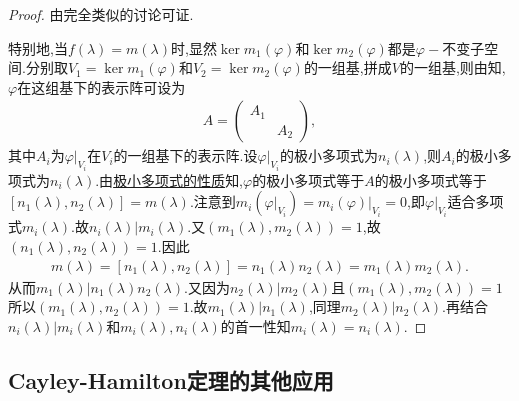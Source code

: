 \documentclass[../../main.tex]{subfiles}%
\begin{document}
\begin{proof}
由完全类似的讨论可证.

特别地,当$f(\lambda)=m(\lambda)$时,显然$\ker m_1\left( \varphi \right)$和$\ker m_2\left( \varphi \right)$都是$\varphi-$不变子空间.分别取$V_1=\ker m_1\left( \varphi \right)$和$V_2=\ker m_2\left( \varphi \right)$的一组基,拼成$V$的一组基,则由知,$\varphi$在这组基下的表示阵可设为
\begin{align*}
A=\begin{pmatrix}
A_1&		\\
&		A_2
\end{pmatrix},
\end{align*}
其中$A_i$为$\varphi |_{V_i}$在$V_i$的一组基下的表示阵.设$\varphi |_{V_i}$的极小多项式为$n_i\left( \lambda \right)$,则$A_i$的极小多项式为$n_i\left( \lambda \right)$.由\hyperref[proposition:极小多项式的性质]{极小多项式的性质}知,$\varphi$的极小多项式等于$A$的极小多项式等于$\left[ n_1\left( \lambda \right) ,n_2\left( \lambda \right) \right] =m\left( \lambda \right)$.注意到$m_i\left( \varphi |_{V_i} \right) =m_i\left( \varphi \right) |_{V_i}=0$,即$\varphi |_{V_i}$适合多项式$m_i\left( \lambda \right)$.故$n_i\left( \lambda \right) |m_i\left( \lambda \right)$.又$\left( m_1\left( \lambda \right) ,m_2\left( \lambda \right) \right) =1$,故$\left( n_1\left( \lambda \right) ,n_2\left( \lambda \right) \right) =1$.因此
\begin{align*}
m\left( \lambda \right) =\left[ n_1\left( \lambda \right) ,n_2\left( \lambda \right) \right] =n_1\left( \lambda \right) n_2\left( \lambda \right) =m_1\left( \lambda \right) m_2\left( \lambda \right).
\end{align*}
从而$m_1\left( \lambda \right) |n_1\left( \lambda \right) n_2\left( \lambda \right)$.又因为$n_2\left( \lambda \right) |m_2\left( \lambda \right)$且$\left( m_1\left( \lambda \right) ,m_2\left( \lambda \right) \right) =1$所以$\left( m_1\left( \lambda \right) ,n_2\left( \lambda \right) \right) =1$.故$m_1\left( \lambda \right) |n_1\left( \lambda \right)$,同理$m_2\left( \lambda \right) |n_2\left( \lambda \right)$.再结合$n_i\left( \lambda \right) |m_i\left( \lambda \right)$和$m_i\left( \lambda \right),n_i\left( \lambda \right)$的首一性知$m_i\left( \lambda \right) =n_i\left( \lambda \right)$.
\end{proof}



\subsection{Cayley-Hamilton定理的其他应用}
\end{document}
